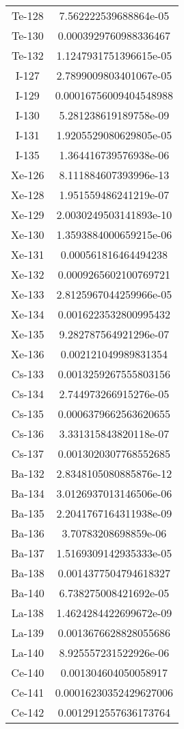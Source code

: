 \begin{table}[h!]
\begin{tabular}{|| c || c |}
Te-128 & 7.562222539688864e-05 \\
Te-130 & 0.0003929760988336467 \\
Te-132 & 1.1247931751396615e-05 \\
I-127 & 2.7899009803401067e-05 \\
I-129 & 0.00016756009404548988 \\
I-130 & 5.281238619189758e-09 \\
I-131 & 1.9205529080629805e-05 \\
I-135 & 1.364416739576938e-06 \\
Xe-126 & 8.111884607393996e-13 \\
Xe-128 & 1.951559486241219e-07 \\
Xe-129 & 2.0030249503141893e-10 \\
Xe-130 & 1.3593884000659215e-06 \\
Xe-131 & 0.000561816464494238 \\
Xe-132 & 0.0009265602100769721 \\
Xe-133 & 2.8125967044259966e-05 \\
Xe-134 & 0.0016223532800995432 \\
Xe-135 & 9.282787564921296e-07 \\
Xe-136 & 0.002121049989831354 \\
Cs-133 & 0.0013259267555803156 \\
Cs-134 & 2.744973266915276e-05 \\
Cs-135 & 0.0006379662563620655 \\
Cs-136 & 3.331315843820118e-07 \\
Cs-137 & 0.0013020307768552685 \\
Ba-132 & 2.8348105080885876e-12 \\
Ba-134 & 3.0126937013146506e-06 \\
Ba-135 & 2.2041767164311938e-09 \\
Ba-136 & 3.70783208698859e-06 \\
Ba-137 & 1.5169309142935333e-05 \\
Ba-138 & 0.0014377504794618327 \\
Ba-140 & 6.738275008421692e-05 \\
La-138 & 1.4624284422699672e-09 \\
La-139 & 0.0013676628828055686 \\
La-140 & 8.925557231522926e-06 \\
Ce-140 & 0.001304604050058917 \\
Ce-141 & 0.00016230352429627006 \\
Ce-142 & 0.0012912557636173764 \\

\end{tabular}
\end{table}
